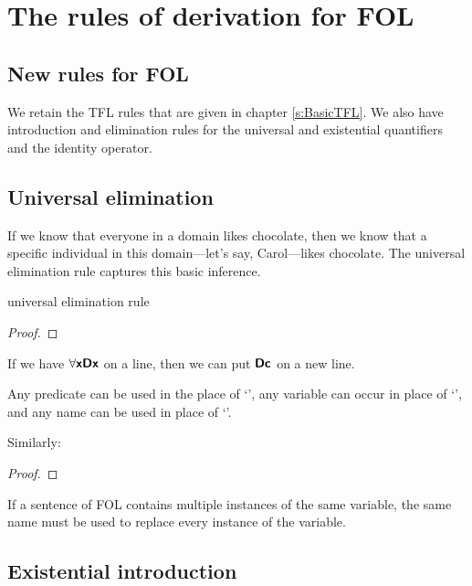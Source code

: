 \graphicspath{{figures--FOL/}}

\chapter{The rules of derivation for FOL}\label{FOL-rules}

\section{New rules for FOL}

We retain the TFL rules that are given in chapter \ref{s:BasicTFL}. We also have introduction and elimination rules for the universal and existential quantifiers and the identity operator.

\section{Universal elimination}

If we know that everyone in a domain likes chocolate, then we know that a specific individual in this domain---let's say, Carol---likes chocolate. The universal elimination rule captures this basic inference. 

\begin{factboxy}{universal elimination rule}
\begin{proof}
	 
\end{proof}

\small{If we have $\forall \bm{\mathsf{x Dx}}$ on a line, then we can put $\bm{\mathsf{Dc}}$ on a new line.
\smallskip

Any predicate can  be used in the place of `', any variable can occur in place of `', and any name can be used in place of `'.
\smallskip

Similarly:}

\begin{proof}
	 
\end{proof}

\small{If a sentence of FOL contains multiple instances of the same variable, the same name must be used to replace every instance of the variable.}

\end{factboxy}


\section{Existential introduction}

